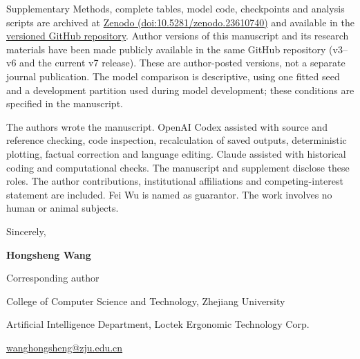 \documentclass[11pt,a4paper]{article}
\begin{document}
Supplementary Methods, complete tables, model code, checkpoints and analysis scripts are archived at \href{https://doi.org/10.5281/zenodo.23610740}{Zenodo (doi:10.5281/zenodo.23610740)} and available in the \href{https://github.com/wanghongsheng01/bib-amp-review-materials-20261023/tree/v7-2026-10-24}{versioned GitHub repository}. Author versions of this manuscript and its research materials have been made publicly available in the same GitHub repository (v3--v6 and the current v7 release). These are author-posted versions, not a separate journal publication. The model comparison is descriptive, using one fitted seed and a development partition used during model development; these conditions are specified in the manuscript.

The authors wrote the manuscript. OpenAI Codex assisted with source and reference checking, code inspection, recalculation of saved outputs, deterministic plotting, factual correction and language editing. Claude assisted with historical coding and computational checks. The manuscript and supplement disclose these roles. The author contributions, institutional affiliations and competing-interest statement are included. Fei Wu is named as guarantor. The work involves no human or animal subjects.

Sincerely,\par
\textbf{Hongsheng Wang}\par
Corresponding author\par
College of Computer Science and Technology, Zhejiang University\par
Artificial Intelligence Department, Loctek Ergonomic Technology Corp.\par
\href{mailto:wanghongsheng@zju.edu.cn}{wanghongsheng@zju.edu.cn}
\end{document}
